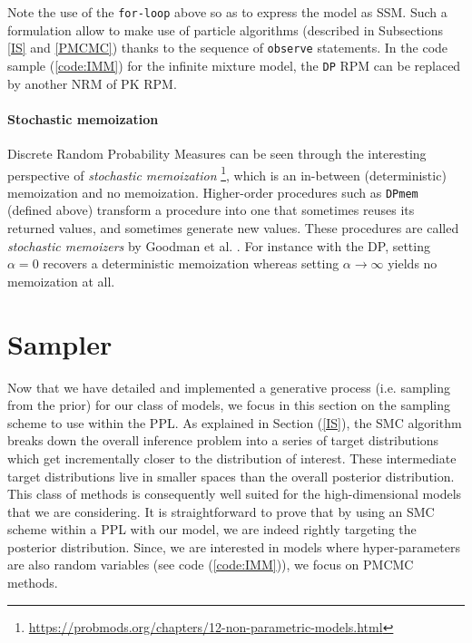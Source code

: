 Note the use of the \texttt{for-loop} above so as to express the model as \acrlong{SSM}. Such a formulation allow to make use of particle algorithms (described in Subsections \ref{IS} and \ref{PMCMC}) thanks to the sequence of \texttt{observe} statements.
In the code sample (\ref{code:IMM}) for the infinite mixture model, the \texttt{DP} \acrlong{RPM} can be replaced by another \acrlong{NRM} of \acrlong{PK} \gls{RPM}.


\paragraph{Stochastic memoization}
Discrete Random Probability Measures can be seen through the interesting perspective of \textit{stochastic memoization} \footnote{\url{https://probmods.org/chapters/12-non-parametric-models.html}}, which is an in-between (deterministic) memoization and no memoization.
Higher-order procedures such as \texttt{DPmem} (defined above) transform a procedure into one that sometimes reuses its returned values, and sometimes generate new values. These procedures are called \textit{stochastic memoizers} by Goodman et al. \cite{Goodman:2012uq}.
For instance with the \gls{DP}, setting $\alpha = 0$ recovers a deterministic memoization whereas setting $\alpha \rightarrow \infty$ yields no memoization at all.

\section{Sampler}

Now that we have detailed and implemented a generative process (i.e. sampling from the prior) for our class of models, we focus in this section on the sampling scheme to use within the \acrlong{PPL}.
As explained in Section (\ref{IS}), the \acrfull{SMC} algorithm breaks down the overall inference problem into a series of target distributions which get incrementally closer to the distribution of interest. These intermediate target distributions live in smaller spaces than the overall posterior distribution. This class of methods is consequently well suited for the high-dimensional models that we are considering. It is straightforward to prove that by using an \gls{SMC} scheme within a \gls{PPL} with our model, we are indeed rightly targeting the posterior distribution.
Since, we are interested in models where hyper-parameters are also random variables (see code (\ref{code:IMM})), we focus on \acrlong{PMCMC} methods.

